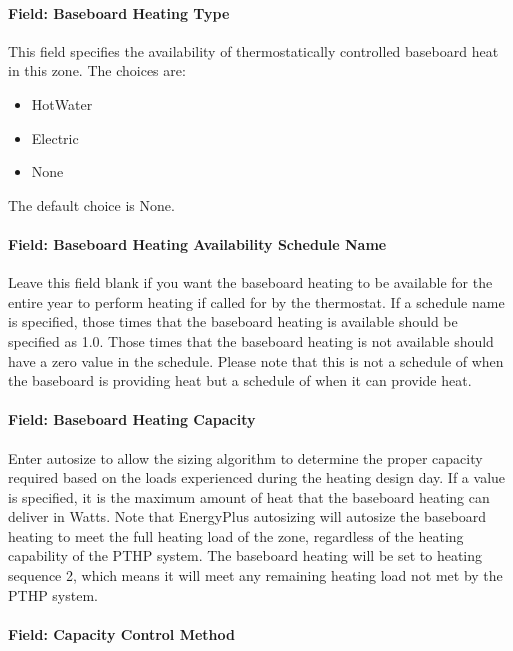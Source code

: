 \paragraph{Field: Baseboard Heating Type}\label{field-baseboard-heating-type-3}

This field specifies the availability of thermostatically controlled baseboard heat in this zone. The choices are:

\begin{itemize}
\item
  HotWater
\item
  Electric
\item
  None
\end{itemize}

The default choice is None.

\paragraph{Field: Baseboard Heating Availability Schedule Name}\label{field-baseboard-heating-availability-schedule-name-3}

Leave this field blank if you want the baseboard heating to be available for the entire year to perform heating if called for by the thermostat. If a schedule name is specified, those times that the baseboard heating is available should be specified as 1.0. Those times that the baseboard heating is not available should have a zero value in the schedule. Please note that this is not a schedule of when the baseboard is providing heat but a schedule of when it can provide heat.

\paragraph{Field: Baseboard Heating Capacity}\label{field-baseboard-heating-capacity-3}

Enter autosize to allow the sizing algorithm to determine the proper capacity required based on the loads experienced during the heating design day. If a value is specified, it is the maximum amount of heat that the baseboard heating can deliver in Watts. Note that EnergyPlus autosizing will autosize the baseboard heating to meet the full heating load of the zone, regardless of the heating capability of the PTHP system. The baseboard heating will be set to heating sequence 2, which means it will meet any remaining heating load not met by the PTHP system.

\paragraph{Field: Capacity Control Method}\label{field-capacity-control-method-3}

